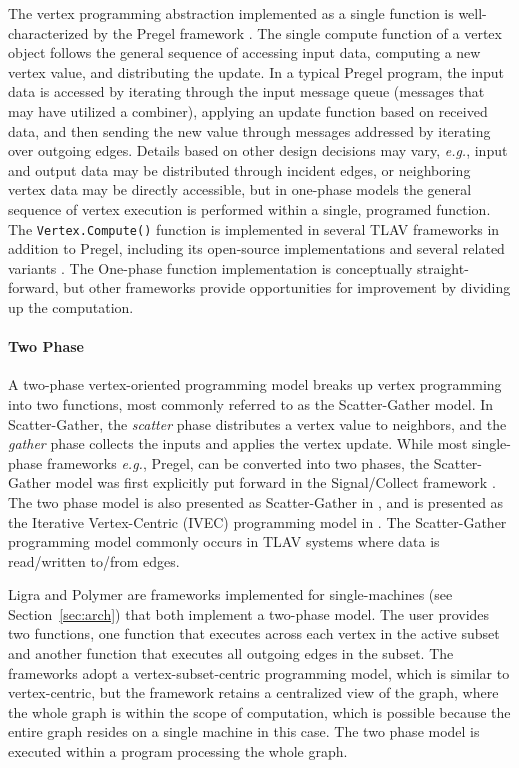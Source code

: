 \documentclass[reprint,twocolumn,showpacs,preprintnumbers,amsmath, aps,pre,amssymb]{revtex4-1}
\begin{document}
The vertex programming abstraction implemented as a single function is well-characterized by the Pregel framework \cite{Malewicz2010}.  The single compute function of a vertex object follows the general sequence of accessing input data, computing a new vertex value, and distributing the update.  In a typical Pregel program, the input data is accessed by iterating through the input message queue (messages that may have utilized a combiner), applying an update function based on received data, and then sending the new value through messages addressed by iterating over outgoing edges.  Details based on other design decisions may vary, {\em e.g.}, input and output data may be distributed through incident edges, or neighboring vertex data may be directly accessible, but in one-phase models the general sequence of vertex execution is performed within a single, programed function.  The \texttt{Vertex.Compute()} function is implemented in several TLAV frameworks in addition to Pregel, including its open-source implementations \cite{Avery2011,Seo2010} and several related variants \cite{Salihoglu2013,Bao2013,Redekopp2013}.  The One-phase function implementation is conceptually straight-forward, but other frameworks provide opportunities for improvement by dividing up the computation.

\paragraph{Two Phase} 

A two-phase vertex-oriented programming model breaks up vertex programming into two functions, most commonly referred to as the Scatter-Gather model.  In Scatter-Gather, the \textit{scatter} phase distributes a vertex value to neighbors, and the \textit{gather} phase collects the inputs and applies the vertex update.  While most single-phase frameworks {\em e.g.}, Pregel, can be converted into two phases, the Scatter-Gather model was first explicitly put forward in the Signal/Collect framework \cite{Stutz2010}. The two phase model is also presented as Scatter-Gather in \cite{Roy2013}, and is presented as the Iterative Vertex-Centric (IVEC) programming model in \cite{Yoneki2013}.  The Scatter-Gather programming model commonly occurs in TLAV systems where data is read/written to/from edges.  

Ligra and Polymer are frameworks implemented for single-machines (see Section~\ref{sec:arch}) that both implement a two-phase model.  The user provides two functions, one function that executes across each vertex in the active subset and another function that executes all outgoing edges in the subset.  The frameworks adopt a vertex-subset-centric programming model, which is similar to vertex-centric, but the framework retains a centralized view of the graph, where the whole graph is within the scope of computation, which is possible because the entire graph resides on a single machine in this case.  The two phase model is executed within a program processing the whole graph.
\end{document}
